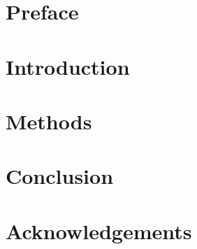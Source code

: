 \documentclass[11pt,twoside]{report} %
\begin{document}




\tableofcontents %

\thispagestyle{empty}

\clearpage
{}

\chapter*{Preface}


\chapter{Introduction}


\chapter{Methods}


%

\chapter{Conclusion}
\label{ch:conclusions}


\chapter*{Acknowledgements}




\end{document}
